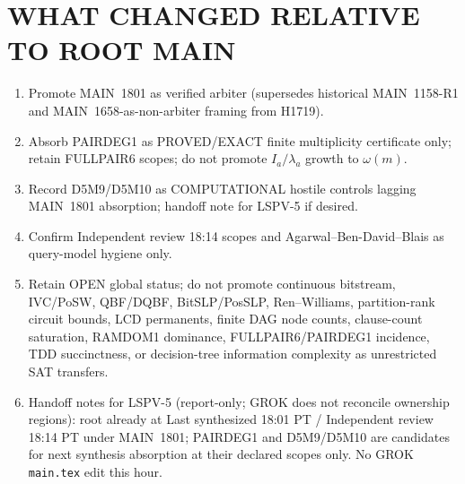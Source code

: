 \documentclass[11pt]{article}
\begin{document}
\section*{WHAT CHANGED RELATIVE TO ROOT MAIN}
\begin{enumerate}
\item Promote MAIN~1801 as verified arbiter (supersedes historical MAIN~1158-R1
and MAIN~1658-as-non-arbiter framing from H1719).
\item Absorb PAIRDEG1 as PROVED/EXACT finite multiplicity certificate only;
retain FULLPAIR6 scopes; do not promote $I_a/\lambda_a$ growth to $\omega(m)$.
\item Record D5M9/D5M10 as COMPUTATIONAL hostile controls lagging MAIN~1801
absorption; handoff note for LSPV-5 if desired.
\item Confirm Independent review 18:14 scopes and Agarwal--Ben-David--Blais as
query-model hygiene only.
\item Retain OPEN global status; do not promote continuous bitstream, IVC/PoSW,
QBF/DQBF, BitSLP/PosSLP, Ren--Williams, partition-rank circuit bounds, LCD
permanents, finite DAG node counts, clause-count saturation, RAMDOM1 dominance,
FULLPAIR6/PAIRDEG1 incidence, TDD succinctness, or decision-tree information
complexity as unrestricted SAT transfers.
\item Handoff notes for LSPV-5 (report-only; GROK does not reconcile ownership
regions): root already at Last synthesized 18:01 PT / Independent review
18:14 PT under MAIN~1801; PAIRDEG1 and D5M9/D5M10 are candidates for next
synthesis absorption at their declared scopes only. No GROK \texttt{main.tex}
edit this hour.
\end{enumerate}
\end{document}
